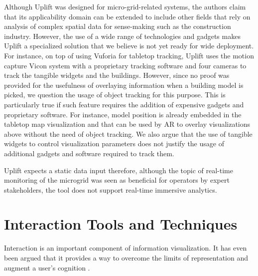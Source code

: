 \documentclass{vgtc}                          %
\begin{document}
\noindent Although Uplift was designed for micro-grid-related systems,
the authors claim that its applicability domain can be extended to include
other fields that rely on analysis of complex spatial data for sense-making
such as the construction industry. However, the use of a wide range of technologies
and gadgets makes Uplift a specialized solution that we believe is not yet
ready for wide deployment. For instance, on top of using Vuforia for tabletop
tracking, Uplift uses the motion capture Vicon system
\cite{vicon} with a proprietary tracking software and four
cameras to track the tangible widgets and the buildings. However,
since no proof was provided for the usefulness of overlaying information when
a building model is picked, we question the usage of object tracking for this
purpose. This is particularly true if such feature requires the addition of
expensive gadgets and proprietary software. For instance, model position is
already embedded in the tabletop map visualization and that can be used by AR
to overlay visualizations above without the need of object tracking. We also
argue that the use of tangible widgets to control visualization parameters does
not justify the usage of additional gadgets and software required to track
them.

\medskip

\noindent Uplift expects a static data input therefore, although the topic of
real-time monitoring of the microgrid was seen as beneficial for operators by
expert stakeholders, the tool does not support real-time immersive analytics.

\section{Interaction Tools and Techniques}

\noindent Interaction is an important component of information visualization. It has even been argued that it provides
a way to overcome the limits of representation and augment a user's cognition \cite{interaction_infovis}.

\medskip
\end{document}
